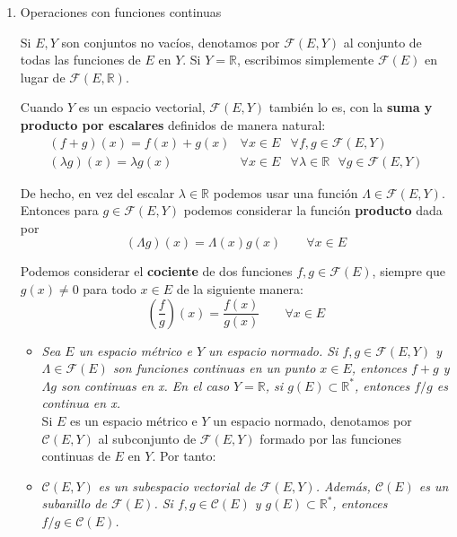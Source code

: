 \documentclass[a4paper, 12pt]{article}
\begin{document}
\begin{enumerate}[label=\textbf{\arabic*}.]
\begin{enumerate}[label=\textit{\alph*})]
\bigskip

	\item Operaciones con funciones continuas
	
Si \(E,Y\) son conjuntos no vacíos, denotamos por \(\mathcal{F}(E,Y)\) al conjunto de todas las funciones de \(E\) en \(Y\). Si \(Y = \mathbb{R}\), escribimos simplemente \(\mathcal{F}(E)\) en lugar de \(\mathcal{F}(E,\mathbb{R})\). 

Cuando \(Y\) es un espacio vectorial, \(\mathcal{F}(E,Y)\) también lo es, con la \textbf{suma y producto por escalares} definidos de manera natural:
\[
\begin{array}{ccc}
	(f+g)(x) = f(x) + g(x) & \forall x \in E & \forall f,g \in \mathcal{F}(E,Y) \\
	(\lambda g) (x) = \lambda g(x) & \forall x \in E & \forall \lambda \in \mathbb{R} \text{ } \forall g \in \mathcal{F}(E,Y)
\end{array}
\]

De hecho, en vez del escalar \(\lambda \in \mathbb{R}\) podemos usar una función \(\Lambda \in \mathcal{F}(E,Y)\). Entonces para \(g \in \mathcal{F}(E,Y)\) podemos considerar la función \textbf{producto} dada por
\[
	(\Lambda g)(x) = \Lambda (x) g(x) \qquad \forall x \in E
\]

Podemos considerar el \textbf{cociente} de dos funciones \(f,g \in \mathcal{F}(E)\), siempre que \(g(x) \neq 0\) para todo \(x \in E\) de la siguiente manera:
\[
	\left( \frac{f}{g} \right) (x) = \frac{f(x)}{g(x)} \qquad \forall x \in E
\]

	\begin{itemize}
		\item \textit{Sea \(E\) un espacio métrico e \(Y\) un espacio normado. Si \(f,g \in \mathcal{F}(E,Y)\) y \(\Lambda \in \mathcal{F}(E)\) son funciones continuas en un punto \(x \in E\), entonces \(f + g\) y \(\Lambda g\) son continuas en x. En el caso \(Y = \mathbb{R}\), si \(g(E) \subset \mathbb{R}^*\), entonces \(f/g\) es continua en x.} \\
		
Si \(E\) es un espacio métrico e \(Y\) un espacio normado, denotamos por \(\mathcal{C}(E,Y)\) al subconjunto de \(\mathcal{F}(E,Y)\) formado por las funciones continuas de \(E\) en \(Y\). Por tanto:
		\item \(\mathcal{C}(E,Y)\) \textit{es un subespacio vectorial de \(\mathcal{F}(E,Y)\). Además, \(\mathcal{C}(E)\) es un subanillo de \(\mathcal{F}(E)\). Si \(f,g \in \mathcal{C}(E)\) y \(g(E) \subset \mathbb{R}^*\), entonces \(f/g \in \mathcal{C}(E)\).} \\
		

\end{itemize}
\end{enumerate}
\end{enumerate}
\end{document}
